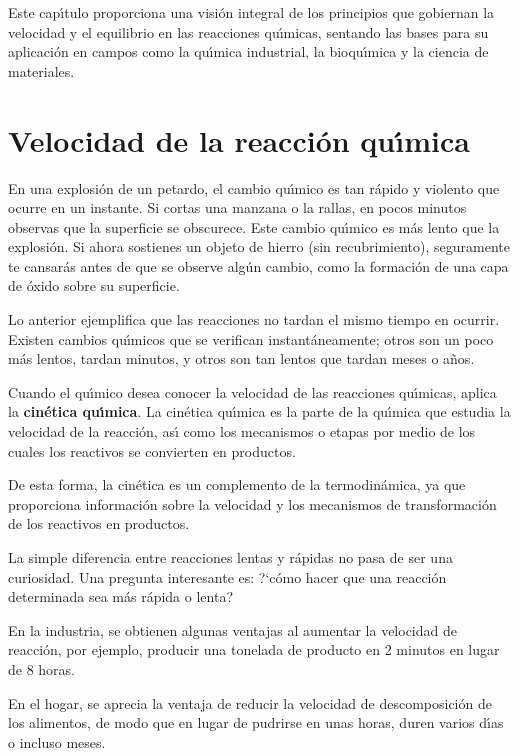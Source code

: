 Este cap\'{\i}tulo proporciona una visi\'on integral de los principios que gobiernan la velocidad y el equilibrio en las reacciones qu\'{\i}micas, sentando las bases para su aplicaci\'on en campos como la qu\'{\i}mica industrial, la bioqu\'{\i}mica y la ciencia de materiales.

\section{Velocidad de la reacci\'on qu\'{\i}mica}\label{vrq}
En una explosi\'on de un petardo, el cambio qu\'{\i}mico es tan r\'apido y violento que ocurre en un instante. Si cortas una manzana o la rallas, en pocos minutos observas que la superficie se obscurece. Este cambio qu\'{\i}mico es m\'as lento que la explosi\'on. Si ahora sostienes un objeto de hierro (sin recubrimiento), seguramente te cansar\'as antes de que se observe alg\'un cambio, como la formaci\'on de una capa de \'oxido sobre su superficie.

Lo anterior ejemplifica que las reacciones no tardan el mismo tiempo en ocurrir. Existen cambios qu\'{\i}micos que se verifican instant\'aneamente; otros son un poco m\'as lentos, tardan minutos, y otros son tan lentos que tardan meses o a\~nos.

Cuando el qu\'{\i}mico desea conocer la velocidad de las reacciones qu\'{\i}micas, aplica la \textbf{cin\'etica qu\'{\i}mica}. La cin\'etica qu\'{\i}mica es la parte de la qu\'{\i}mica que estudia la velocidad de la reacci\'on, as\'{\i} como los mecanismos o etapas por medio de los cuales los reactivos se convierten en productos.

De esta forma, la cin\'etica es un complemento de la termodin\'amica, ya que proporciona informaci\'on sobre la velocidad y los mecanismos de transformaci\'on de los reactivos en productos.

La simple diferencia entre reacciones lentas y r\'apidas no pasa de ser una curiosidad. Una pregunta interesante es: ?`c\'omo hacer que una reacci\'on determinada sea m\'as r\'apida o lenta?

En la industria, se obtienen algunas ventajas al aumentar la velocidad de reacci\'on, por ejemplo, producir una tonelada de producto en 2 minutos en lugar de 8 horas.

En el hogar, se aprecia la ventaja de reducir la velocidad de descomposici\'on de los alimentos, de modo que en lugar de pudrirse en unas horas, duren varios d\'{\i}as o incluso meses.

